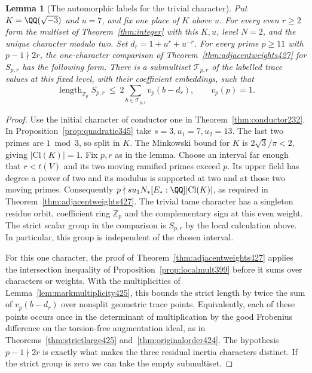 \documentclass[a4paper,11pt]{article}
\newtheorem{lemma}[proposition]{Lemma}
\theoremstyle{definition}
\theoremstyle{remark}
\newcommand{\ZZ}{\mathbb Z}\newcommand{\ord}{\operatorname{ord}}
\numberwithin{equation}{section}
\begin{document}
\begin{lemma}[The automorphic labels for the trivial character]
\leavevmode\label{lem:rationallevel538}
Put \(K=\QQ(\sqrt{-3})\) and \(u=7\), and fix one place of \(K\)
above \(u\). For every even \(r\ge2\) form the multiset of
Theorem~\ref{thm:integer} with this \(K,u\), level \(N=2\), and
the unique character modulo two. Set \(d_r=1+u^r+u^{-r}\).
For every prime \(p\ge11\) with \(p-1\nmid2r\), the one-character
comparison of Theorem~\ref{thm:adjacentweights427} for \(S_{p,r}\)
has the following form. There is a submultiset \(\mathcal T_{p,r}\)
of the labelled trace values at this fixed level, with their
coefficient embeddings, such that
\[
 \operatorname{length}_{\ZZ_p} S_{p,r}
       \ \le\ 2\sum_{b\in\mathcal T_{p,r}}v_p(b-d_r),
       \qquad v_p(p)=1 .
\]
\end{lemma}
\begin{proof}
Use the initial character of conductor one in
Theorem~\ref{thm:conductor232}. In
Proposition~\ref{prop:quadratic345} take \(s=3,u_1=7,u_2=13\).
The last two primes are \(1\bmod3\), so split in \(K\).
The Minkowski bound for \(K\) is \(2\sqrt3/\pi<2\), giving
\(|\mathrm{Cl}(K)|=1\). Fix \(p,r\) as in the lemma. Choose
an interval far enough that \(r<t(V)\) and its two moving
ramified primes exceed \(p\). Its upper field has degree a
power of two and its modulus is supported at two and at those
two moving primes. Consequently
\(p\nmid su_1N_*[E_*:\QQ]|\mathrm{Cl}(K)|\), as required in
Theorem~\ref{thm:adjacentweights427}. The trivial tame character
has a singleton residue orbit, coefficient ring \(\ZZ_p\) and
the complementary sign at this even weight. The strict scalar
group in the comparison is \(S_{p,r}\) by the local calculation
above. In particular, this group is independent of the chosen
interval.

For this one character, the proof of
Theorem~\ref{thm:adjacentweights427} applies the intersection
inequality of Proposition~\ref{prop:localmult399} before it sums
over characters or weights. With the multiplicities of
Lemma~\ref{lem:markmultiplicity425}, this bounds the strict
length by twice the sum of \(v_p(b-d_r)\) over nonsplit
geometric trace points. Equivalently, each of these points
occurs once in the determinant of multiplication by the good
Frobenius difference on the torsion-free augmentation ideal,
as in Theorems~\ref{thm:strictlarge425} and~\ref{thm:originalorder424}.
The hypothesis \(p-1\nmid2r\) is exactly what makes the
three residual inertia characters distinct. If the strict
group is zero we can take the empty submultiset.


\end{proof}
\end{document}
